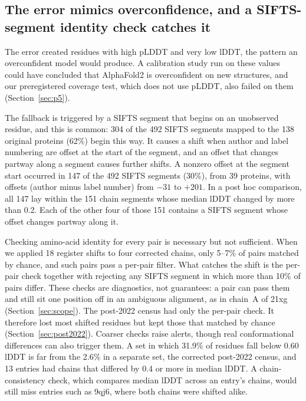 \documentclass{article}
\begin{document}
\subsection{The error mimics overconfidence, and a SIFTS-segment identity check catches it}
\label{sec:detect}

The error created residues with high pLDDT and very low lDDT, the pattern an
overconfident model would produce. A calibration study run on these values
could have concluded that AlphaFold2 is overconfident on new structures, and
our preregistered coverage test, which does not use pLDDT, also failed on
them (Section~\ref{sec:p5}).

The fallback is triggered by a SIFTS segment that begins on an unobserved
residue, and this is common: 304 of the 492 SIFTS segments mapped to the 138 original proteins
(62\%) begin this way. It causes a shift when author and label numbering are offset at the start of the segment, and an offset that changes partway along a segment causes further shifts. A nonzero offset at the segment start occurred in 147 of the 492 SIFTS segments (30\%), from 39 proteins, with offsets (author minus label number) from $-31$
to $+201$. In a post hoc comparison, all 147 lay within the
151 chain segments whose median lDDT changed by more than 0.2. Each of the
other four of those 151 contains a SIFTS segment whose offset changes
partway along it.

Checking amino-acid identity for every pair is necessary but not
sufficient. When we applied 18 register shifts to four corrected chains, only 5--7\% of pairs matched by chance, and such pairs pass a per-pair filter.
What catches the shift is the per-pair check together with rejecting any
SIFTS segment in which more than 10\% of pairs differ. These checks are diagnostics, not guarantees: a pair can pass them and still sit one position off in an ambiguous alignment, as in chain~A of 21xg (Section~\ref{sec:scope}). The post-2022 census
had only the per-pair check. It therefore lost most shifted residues but
kept those that matched by chance (Section~\ref{sec:post2022}). Coarser checks raise alerts, though real conformational differences can also trigger them. A set in which 31.9\% of residues fall below 0.60
lDDT is far from the 2.6\% in a separate set, the corrected post-2022
census, and 13 entries had chains that differed by 0.4 or more in median
lDDT. A chain-consistency check, which compares median lDDT across an
entry's chains, would still miss entries such as 9qj6, where both
chains were shifted alike.
\end{document}
